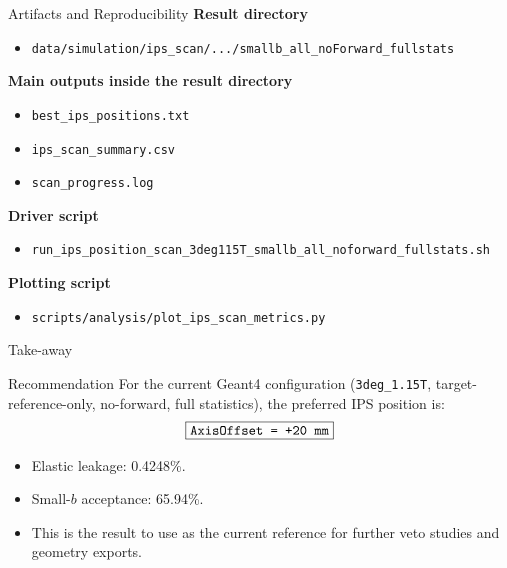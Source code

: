 \documentclass[aspectratio=169]{beamer}
\begin{document}
\begin{frame}{Artifacts and Reproducibility}
\small
\textbf{Result directory}
\begin{itemize}
  \item \texttt{data/simulation/ips\_scan/.../smallb\_all\_noForward\_fullstats}
\end{itemize}

\textbf{Main outputs inside the result directory}
\begin{itemize}
  \item \texttt{best\_ips\_positions.txt}
  \item \texttt{ips\_scan\_summary.csv}
  \item \texttt{scan\_progress.log}
\end{itemize}

\textbf{Driver script}
\begin{itemize}
  \item \texttt{run\_ips\_position\_scan\_3deg115T\_smallb\_all\_noforward\_fullstats.sh}
\end{itemize}

\textbf{Plotting script}
\begin{itemize}
  \item \texttt{scripts/analysis/plot\_ips\_scan\_metrics.py}
\end{itemize}
\end{frame}

\begin{frame}{Take-away}
\begin{block}{Recommendation}
For the current Geant4 configuration (\texttt{3deg\_1.15T}, target-reference-only, no-forward, full statistics), the preferred IPS position is:
\[
  \boxed{\text{\texttt{AxisOffset = +20 mm}}}
\]
\end{block}

\begin{itemize}
  \item Elastic leakage: 0.4248\%.
  \item Small-$b$ acceptance: 65.94\%.
  \item This is the result to use as the current reference for further veto studies and geometry exports.
\end{itemize}
\end{frame}
\end{document}
